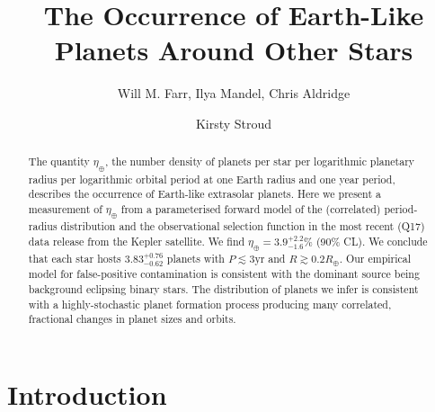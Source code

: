 \documentclass[apjl]{emulateapj}
\newcommand{\etaearth}{\eta_\oplus}
\newcommand{\REarth}{R_\oplus}
\newcommand{\earange}{3.9_{-1.6}^{+2.2}\%}
\newcommand{\rplrange}{3.83_{-0.62}^{+0.76}}
\begin{document}
\title{The Occurrence of Earth-Like Planets Around Other Stars}
\author{Will M. Farr, Ilya Mandel, Chris Aldridge \and Kirsty Stroud}

\begin{abstract}
  The quantity $\etaearth$, the number density of planets per star per
  logarithmic planetary radius per logarithmic orbital period at one
  Earth radius and one year period, describes the occurrence of
  Earth-like extrasolar planets.  Here we present a measurement of
  $\etaearth$ from a parameterised forward model of the (correlated)
  period-radius distribution and the observational selection function
  in the most recent (Q17) data release from the Kepler satellite.  We
  find $\etaearth = \earange$ (90\% CL).  We conclude that each star
  hosts $\rplrange$ planets with $P \lesssim 3 \mathrm{yr}$ and $R
  \gtrsim 0.2 \REarth$.  Our empirical model for false-positive
  contamination is consistent with the dominant source being
  background eclipsing binary stars.  The distribution of planets we
  infer is consistent with a highly-stochastic planet formation
  process producing many correlated, fractional changes in planet
  sizes and orbits.
\end{abstract}


\maketitle

\section{Introduction}
\end{document}
